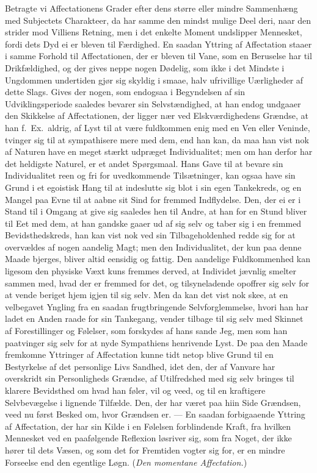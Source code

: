 \documentclass[12pt]{article}
\newcommand{\opage}[1]{\marginnote{\footnotesize\textit{[#1]}}}
\begin{document}
Betragte vi Affectationens Grader efter dens større eller mindre Sammenhæng med Subjectets Charakteer, da har samme den mindst mulige Deel deri, naar den strider mod Villiens Retning, men i det enkelte Moment undslipper Mennesket, fordi dets Dyd ei er bleven til Færdighed. En saadan Yttring af Affectation staaer i samme Forhold til Affectationen, der er bleven til Vane, som en Beruselse har til Drikfældighed, og der gives neppe nogen Dødelig, som ikke i det Mindste i Ungdommen undertiden gjør sig skyldig i smaae, halv ufrivillige Uærligheder af dette Slags. Gives der nogen, som endogsaa i Begyndelsen af sin Udviklingsperiode saaledes bevarer sin Selvstændighed, at han endog undgaaer den Skikkelse af Affectationen, der ligger nær ved Elskværdighedens Grændse, at han f.\ Ex.\ aldrig, af Lyst til at være fuldkommen enig med en Ven eller Veninde, tvinger sig til at sympathisere mere med dem, end han kan, da maa han vist nok af Naturen have en meget stærkt udpræget Individualitet; men om han derfor har det heldigste Naturel, er et andet Spørgsmaal. Hans Gave til at bevare sin Individualitet reen og fri for uvedkommende Tilsætninger, kan ogsaa have sin Grund i et egoistisk Hang til at indeslutte sig blot i sin egen Tankekreds, og en Mangel paa Evne til at aabne sit Sind for fremmed Indflydelse. Den, der ei er i Stand til i Omgang at give sig saaledes hen til Andre, at han for en Stund bliver til Eet med dem, at han gandske gaaer ud af sig selv og taber sig i en fremmed Bevidsthedskreds, han kan vist nok ved sin Tilbageholdenhed redde sig for at overvældes af nogen aandelig Magt; men den \opage{170}Individualitet, der kun paa denne Maade bjerges, bliver altid eensidig og fattig. Den aandelige Fuldkommenhed kan ligesom den physiske Væxt kuns fremmes derved, at Individet jævnlig smelter sammen med, hvad der er fremmed for det, og tilsyneladende opoffrer sig selv for at vende beriget hjem igjen til sig selv. Men da kan det vist nok skee, at en velbegavet Yngling fra en saadan frugtbringende Selvforglemmelse, hvori han har ladet en Anden raade for sin Tankegang, vender tilbage til sig selv med Skinnet af Forestillinger og Følelser, som forskydes af hans sande Jeg, men som han paatvinger sig selv for at nyde Sympathiens henrivende Lyst. De paa den Maade fremkomne Yttringer af Affectation kunne tidt netop blive Grund til en Bestyrkelse af det personlige Livs Sandhed, idet den, der af Vanvare har overskridt sin Personligheds Grændse, af Utilfredshed med sig selv bringes til klarere Bevidsthed om hvad han føler, vil og veed, og til en kraftigere Selvbevægelse i lignende Tilfælde. Den, der har været paa hiin Side Grændsen, veed nu først Besked om, hvor Grændsen er. --- En saadan forbigaaende Yttring af Affectation, der har sin Kilde i en Følelsen forblindende Kraft, fra hvilken Mennesket ved en paafølgende Reflexion løsriver sig, som fra Noget, der ikke hører til dets Væsen, og som det for Fremtiden vogter sig for, er en mindre Forseelse end den egentlige Løgn. (\emph{Den momentane Affectation.})
\end{document}
